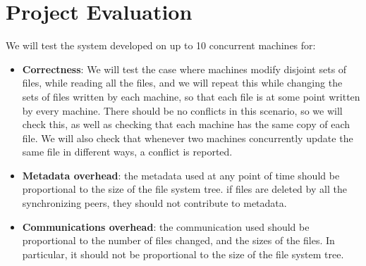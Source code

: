 \section{Project Evaluation}
We will test the system developed on up to 10 concurrent machines for:
\begin{itemize}\renewcommand{\labelitemi}{$\diamond$}
\item {\bf Correctness}: We will test the case where machines modify disjoint sets of files, while reading all the files, and we will repeat this while changing the sets of files written by each machine, so that each file is at some point written by every machine.  There should be no conflicts in this scenario, so we will check this, as well as checking that each machine has the same copy of each file.  We will also check that whenever two machines concurrently update the same file in different ways, a conflict is reported.

\item {\bf Metadata overhead}: the metadata used at any point of time should be proportional to the size of the file system tree. if files are deleted by all the synchronizing peers, they should not contribute to metadata.

\item {\bf Communications overhead}: the communication used should be proportional to the number of files changed, and the sizes of the files. In particular, it should not be proportional to the size of the file system tree.
\end{itemize}
